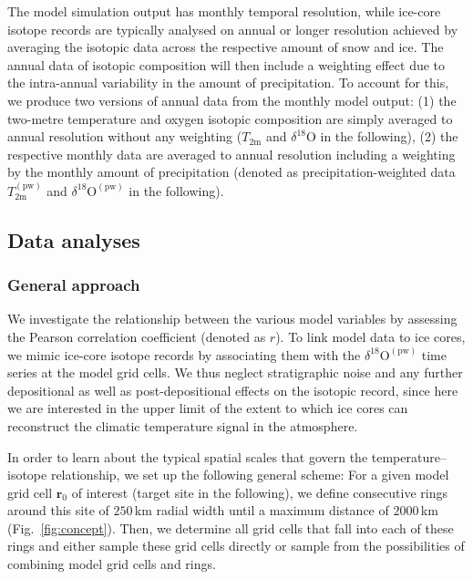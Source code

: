 \documentclass[cp, manuscript]{copernicus}
\begin{document}
The model simulation output has monthly temporal resolution, while ice-core
isotope records are typically analysed on annual or longer resolution achieved
by averaging the isotopic data across the respective amount of snow and
ice. The annual data of isotopic composition will then include a weighting
effect due to the intra-annual variability in the amount of precipitation. To
account for this, we produce two versions of annual data from the monthly model
output: (1) the two-metre temperature and oxygen isotopic composition are simply
averaged to annual resolution without any weighting ($T_{2\mathrm{m}}$ and
$\delta^{18}\mathrm{O}$ in the following), (2) the respective monthly data are
averaged to annual resolution including a weighting by the monthly amount of
precipitation (denoted as precipitation-weighted data
$T_{2\mathrm{m}}^{\mathrm{(pw)}}$ and $\delta^{18}\mathrm{O}^{\mathrm{(pw)}}$ in
the following).

\subsection{Data analyses}\label{methods:main}

\subsubsection{General approach}\label{methods:general}

We investigate the relationship between the various model variables by assessing
the Pearson correlation coefficient (denoted as $r$). To link model data to ice
cores, we mimic ice-core isotope records by associating them with the
$\delta^{18}\mathrm{O}^{\mathrm{(pw)}}$ time series at the model grid cells. We
thus neglect stratigraphic noise and any further depositional as well as
post-depositional effects on the isotopic record, since here we are interested
in the upper limit of the extent to which ice cores can reconstruct the climatic
temperature signal in the atmosphere.

In order to learn about the typical spatial scales that govern the
temperature--isotope relationship, we set up the following general scheme: For a
given model grid cell $\mathbf{r}_0$ of interest (target site in the following),
we define consecutive rings around this site of $250$\,km radial width until a
maximum distance of $2000$\,km (Fig.~\ref{fig:concept}). Then, we determine all
grid cells that fall into each of these rings and either sample these grid cells
directly or sample from the possibilities of combining model grid cells and
rings.
\end{document}
